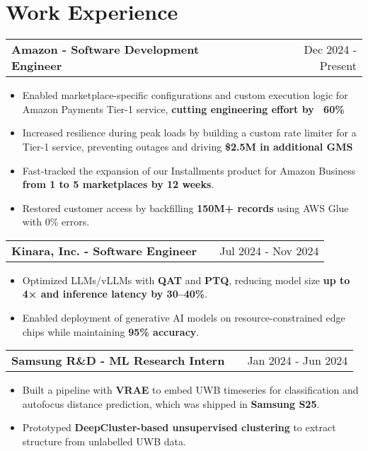 \documentclass[a4paper,12pt]{article}
\makeatletter
\newenvironment{joblong}[2]
    {
    \begin{tabularx}{\linewidth}{@{}l X r@{}}
    \textbf{#1} & \hfill &  #2 \\[3.75pt]
    \end{tabularx}
    \begin{minipage}[t]{\linewidth}
    \begin{itemize}[nosep, leftmargin=1em, itemsep=1pt,label=--]
    }
    {
    \end{itemize}
    \end{minipage}    
    }
\makeatother
\begin{document}


\section{Work Experience}

\begin{joblong}{Amazon - Software Development Engineer}{Dec 2024 - Present}
\item Enabled marketplace-specific configurations and custom execution logic for Amazon Payments Tier-1 service, \textbf{cutting engineering effort by ~60\%} 
\item Increased resilience during peak loads by building a custom rate limiter for a Tier-1 service, preventing outages and driving \textbf{\$2.5M in additional GMS}
\item Fast-tracked the expansion of our Installments product for Amazon Business \textbf{from 1 to 5 marketplaces by 12 weeks}.
\item Restored customer access by backfilling \textbf{150M+ records} using AWS Glue with 0\% errors.
\end{joblong}

\begin{joblong}{Kinara, Inc. - Software Engineer}{Jul 2024 - Nov 2024}
\item Optimized LLMs/vLLMs with \textbf{QAT} and \textbf{PTQ}, reducing model size \textbf{up to 4× and inference latency by 30–40\%}. 
\item Enabled deployment of generative AI models on resource-constrained edge chips while maintaining \textbf{95\% accuracy}.
\end{joblong}

\begin{joblong}{Samsung R\&D - ML Research Intern}{Jan 2024 - Jun 2024}
\item Built a pipeline with \textbf{VRAE} to embed UWB timeseries for classification and autofocus distance prediction, which was shipped in \textbf{Samsung S25}.
\item Prototyped \textbf{DeepCluster-based unsupervised clustering} to extract structure from unlabelled UWB data.
\end{joblong}
\end{document}
